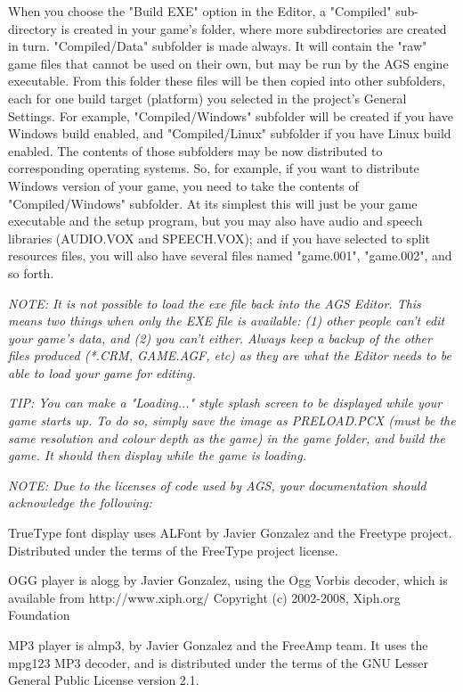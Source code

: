 When you choose the "Build EXE" option in the Editor, a "Compiled" sub-directory is created in your game's folder, where more subdirectories are created in turn.
"Compiled/Data" subfolder is made always. It will contain the "raw" game files that cannot be used on their own, but may be run by the AGS engine executable.
From this folder these files will be then copied into other subfolders, each for one build target (platform) you selected in the project's General Settings.
For example, "Compiled/Windows" subfolder will be created if you have Windows build enabled, and "Compiled/Linux" subfolder if you have Linux build enabled.
The contents of those subfolders may be now distributed to corresponding operating systems.
So, for example, if you want to distribute Windows version of your game, you need to take the contents of "Compiled/Windows" subfolder.
At its simplest this will just be your game executable and the setup program, but you may also have audio and speech libraries (AUDIO.VOX and SPEECH.VOX); and if you have selected to split resources files, you will also have several files named "game.001", "game.002", and so forth.

\it{NOTE: It is not possible to load the exe file back into the AGS Editor. This
means two things when only the EXE file is available: (1) other people can't
edit your game's data, and (2) you can't either. Always keep a backup of the
other files produced (*.CRM, GAME.AGF, etc) as they are what the Editor
needs to be able to load your game for editing.}

\it{TIP:} You can make a "Loading..." style splash screen to be displayed while your game starts
up. To do so, simply save the image as  PRELOAD.PCX (must be the same resolution and colour depth
as the game) in the game folder, and build the game. It should then display while the game is loading.

\it{NOTE: Due to the licenses of code used by AGS, your documentation should acknowledge the
following:}

TrueType font display uses ALFont by Javier Gonzalez and the Freetype project. Distributed
under the terms of the FreeType project license.

OGG player is alogg by Javier Gonzalez, using the Ogg Vorbis decoder, which is available
from http://www.xiph.org/  Copyright (c) 2002-2008, Xiph.org Foundation

MP3 player is almp3, by Javier Gonzalez and the FreeAmp team. It uses the mpg123 MP3 decoder,
and is distributed under the terms of the GNU Lesser General Public License version 2.1.

